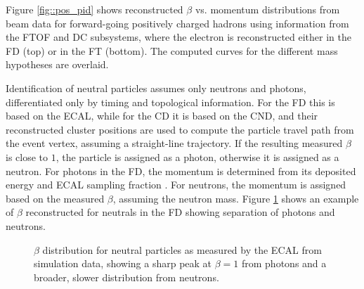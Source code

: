     Figure \ref{fig::pos_pid} shows reconstructed $\beta$ vs. momentum distributions from beam data for forward-going positively charged hadrons using information from the FTOF and DC subsystems, where the electron is reconstructed either in the FD (top) or in the FT (bottom).
    The computed curves for the different mass hypotheses are overlaid.

    Identification of neutral particles assumes only neutrons and photons, differentiated only by timing and topological information.
    For the FD this is based on the ECAL, while for the CD it is based on the CND, and their reconstructed cluster positions are used to compute the particle travel path from the event vertex, assuming a straight-line trajectory.
    If the resulting measured $\beta$ is close to $1$, the particle is assigned as a photon, otherwise it is assigned as a neutron.
    For photons in the FD, the momentum is determined from its deposited energy and ECAL sampling fraction \cite{asryan2020}. %
    For neutrons, the momentum is assigned based on the measured $\beta$, assuming the neutron mass.
    Figure \ref{fig::n_gamma} shows an example of $\beta$ reconstructed for neutrals in the FD showing separation of photons and neutrons.

    \begin{figure}
        \centering{}
        \caption[$\beta$ distribution of neutrals.]{$\beta$ distribution for neutral particles as measured by the ECAL from simulation data, showing a sharp peak at $\beta = 1$ from photons and a broader, slower distribution from neutrons.
        }
        \label{fig::n_gamma}
    \end{figure}


